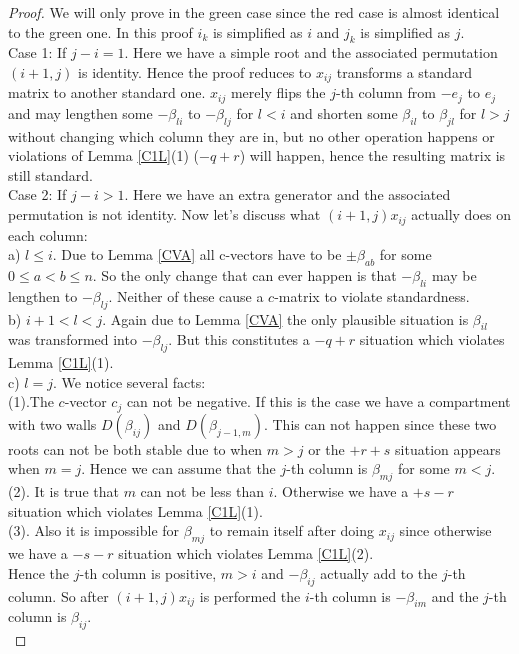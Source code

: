 \begin{proof}
\indent We will only prove in the green case since the red case is almost identical to the green one. In this proof $i_k$ is simplified as $i$ and $j_k$ is simplified as $j$.\\
\indent Case 1: If $j - i  = 1$. Here we have a simple root and the associated permutation $(i+1,j)$ is identity. Hence the proof reduces to $x_{ij}$ transforms a standard matrix to another standard one. $x_{ij}$ merely flips the $j$-th column from $-e_j$ to $e_j$ and may lengthen some $-\beta_{li}$ to $-\beta_{lj}$ for $l<i$ and shorten some $\beta_{il}$ to $\beta_{jl}$ for $l>j$ without changing which column they are in, but no other operation happens or violations of Lemma \ref{C1L}(1) ($-q+r$) will happen, hence the resulting matrix is still standard.\\
\indent Case 2: If $j - i > 1$. Here we have an extra generator and the associated permutation is not identity. Now let's discuss what $(i+1,j) x_{ij}$ actually does on each column:\\
\indent a) $l\leq i$. Due to Lemma \ref{CVA} all c-vectors have to be $\pm\beta_{ab}$ for some $0\leq a<b\leq n$. So the only change that can ever happen is that $-\beta_{li}$ may be lengthen to $-\beta_{lj}$. Neither of these cause a $c$-matrix to violate standardness.\\
\indent b) $i + 1 < l < j$. Again due to Lemma \ref{CVA} the only plausible situation is $\beta_{il}$ was transformed into $-\beta_{lj}$. But this constitutes a $-q+r$ situation which violates Lemma \ref{C1L}(1).\\
\indent c) $l = j$. We notice several facts:\\
\indent (1).The $c$-vector $c_j$ can not be negative. If this is the case we have a compartment with two walls $D(\beta_{ij})$ and $D(\beta_{j-1,m})$. This can not happen since these two roots can not be both stable due to \cite{ST12} when $m>j$ or the $+r+s$ situation appears when $m=j$. Hence we can assume that the $j$-th column is $\beta_{mj}$ for some $m<j$.\\
\indent (2). It is true that $m$ can not be less than $i$. Otherwise we have a $+s-r$ situation which violates Lemma \ref{C1L}(1).\\
\indent (3). Also it is impossible for $\beta_{mj}$ to remain itself after doing $x_{ij}$ since otherwise we have a $-s-r$ situation which violates Lemma \ref{C1L}(2).\\
\indent Hence the $j$-th column is positive, $m>i$ and $-\beta_{ij}$ actually add to the $j$-th column. So after $(i+1,j)x_{ij}$ is performed the $i$-th column is $-\beta_{im}$ and the $j$-th column is $\beta_{ij}$.\\

\end{proof}
